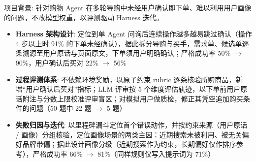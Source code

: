 项目背景: 针对购物 Agent 在多轮导购中未经用户确认即下单、难以利用用户画像的问题，不改模型权重，以评测驱动 Harness 迭代。


\begin{itemize}[parsep=0.5ex]
 \item \textbf{Harness 架构设计}: 定位到单 Agent 问询后连续操作越多越易跳过确认（操作 4 步以上时 91\% 的下单未经确认），据此拆分导购与买手，需求单、候选单逐条溯源至用户原话与页面原文，下单须用户明确确认；严格成功率 50\% $\rightarrow$ 90\%，用户确认后买对 22\% $\rightarrow$ 56\%
\end{itemize}

\begin{itemize}[parsep=0.5ex]
 \item \textbf{过程评测体系}: 不依赖环境奖励，以原子约束 rubric 逐条核验所购商品，新增“用户确认后买对”指标；LLM 评审按 5 个维度评估轨迹，以下单前用户原话附注与分数上限校准评审盲区；对模拟用户做质检，修正其凭空追加购买条件的问题（50 题中 22 题 $\rightarrow$ 5 题）
\end{itemize}

\begin{itemize}[parsep=0.5ex]
 \item \textbf{失败归因与迭代}: 以里程碑漏斗定位首个错误动作，并按约束来源（用户原话 / 画像）分组核验，定位画像场景的两类主因：近期搜索未被利用、被无关偏好品牌带偏；据此设计画像分级（近期搜索作为约束，长期偏好仅作排序参考），严格成功率 66\% $\rightarrow$ 81\%（同样规则仅写入提示词为 71\%）
\end{itemize}
